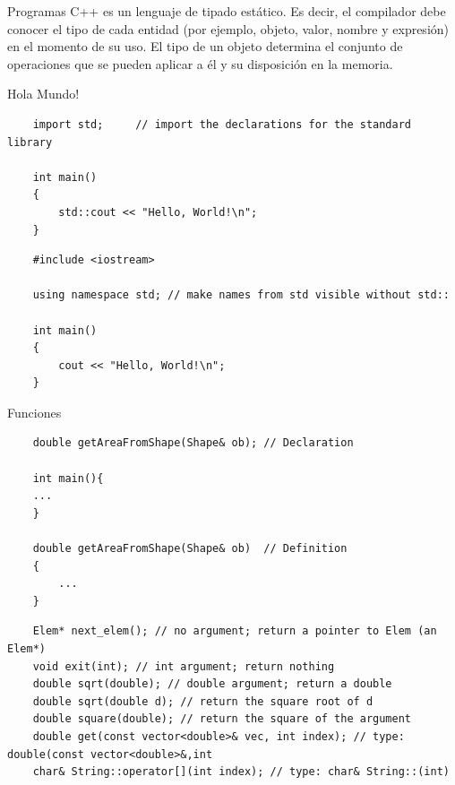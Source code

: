\documentclass[11pt]{beamer}
\begin{document}
	\begin{frame}{Programas}
	\small
	C++ es un lenguaje de tipado estático. Es decir, el compilador debe conocer el tipo de cada entidad (por ejemplo, objeto, valor, nombre y expresión) en el momento de su uso. El tipo de un objeto determina el conjunto de operaciones que se pueden aplicar a él y su disposición en la memoria.
	
	\end{frame}

	
	\begin{frame}[fragile]{Hola Mundo!}
		
	\begin{lstlisting}
	import std;		// import the declarations for the standard library
	
	int main()
	{
		std::cout << "Hello, World!\n";
	}
	\end{lstlisting}
	
	\begin{lstlisting}
	#include <iostream>
	
	using namespace std; // make names from std visible without std::
	
	int main()
	{
		cout << "Hello, World!\n";
	}
	\end{lstlisting}
	
	\end{frame}

	\begin{frame}[fragile]{Funciones}
		
	\begin{lstlisting}
	double getAreaFromShape(Shape& ob);	// Declaration
	
	int main(){
	...
	}
	
	double getAreaFromShape(Shape& ob)	// Definition
	{
		...
	}		
	\end{lstlisting}	
		
		
	\begin{lstlisting}
	Elem* next_elem(); // no argument; return a pointer to Elem (an Elem*)
	void exit(int); // int argument; return nothing
	double sqrt(double); // double argument; return a double
	double sqrt(double d); // return the square root of d
	double square(double); // return the square of the argument
	double get(const vector<double>& vec, int index); // type: double(const vector<double>&,int
	char& String::operator[](int index); // type: char& String::(int)	
		
	\end{lstlisting}
	
	\end{frame}
	
\end{document}
